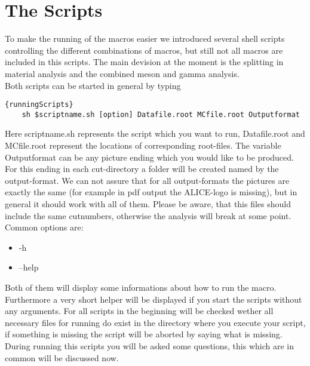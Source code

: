 	\section{The Scripts}
	To make the running of the macros easier we introduced several shell scripts controlling the different combinations of macros, but still not all macros are included in this scripts. The main devision at the moment is the splitting in material analysis and the combined meson and gamma analysis.\\
	Both scripts can be started in general by typing
	\begin{lstlisting}[]{runningScripts}
	sh $scriptname.sh [option] Datafile.root MCfile.root Outputformat
	\end{lstlisting}
	Here scriptname.sh represents the script which you want to run, Datafile.root and MCfile.root represent the locations of corresponding root-files. The variable Outputformat can be any picture ending which you would like to be produced. For this ending in each cut-directory a folder will be created named by the output-format. We can not assure that for all output-formats the pictures are exactly the same (for example in pdf output the ALICE-logo is missing), but in general it should work with all of them. Please be aware, that this files should include the same cutnumbers, otherwise the analysis will break at some point. Common options are:
	\begin{itemize}
	  \item -h
	  \item --help 
	\end{itemize}
	Both of them will display some informations about how to run the macro. Furthermore a very short helper will be displayed if you start the scripts without any arguments. For all scripts in the beginning will be checked wether all necessary files for running do exist in the directory where you execute your script, if something is missing the script will be aborted by saying what is missing. \\
	During running this scripts you will be asked some questions, this which are in common will be discussed now. 
